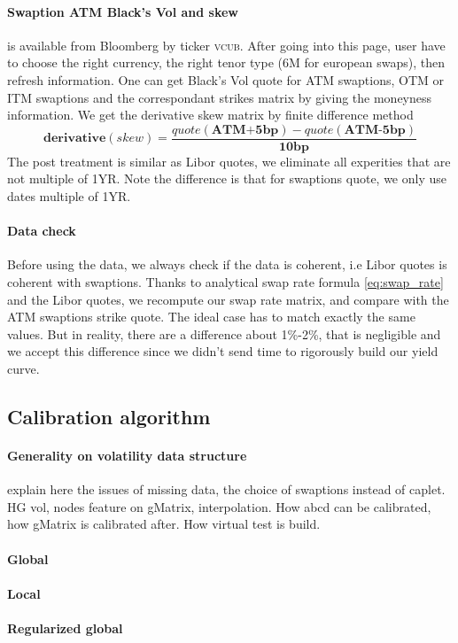 \documentclass[a4paper,10pt]{article}
\newcommand{\bl}[1]{{\scshape  #1}}
\begin{document}
\paragraph{Swaption ATM Black's Vol and skew} is available from Bloomberg by ticker \bl{vcub}. After going into this page, user have to choose the right currency, the right tenor type (6M for european swaps), then refresh information. One can get Black's Vol quote for ATM swaptions, OTM or ITM swaptions and the correspondant strikes matrix by giving the moneyness information. We get the derivative skew matrix by finite difference method
\[
\textbf{derivative}(skew) = \frac{quote (\textbf{ATM+5bp}) - quote(\textbf{ATM-5bp}) }{\textbf{10bp}}
\]
The post treatment is similar as Libor quotes, we eliminate all experities that are not multiple of 1YR. Note the difference is that for swaptions quote, we only use dates multiple of 1YR. 
\paragraph{Data check}
Before using the data, we always check if the data is coherent, i.e Libor quotes is coherent with swaptions. Thanks to analytical swap rate formula \ref{eq:swap_rate} and the Libor quotes, we recompute our swap rate matrix, and compare with the ATM swaptions strike quote. The ideal case has to match exactly the same values. But in reality, there are a difference about 1\%-2\%, that is negligible and we accept this difference since we didn't send time to rigorously build our yield curve.    
\subsection{Calibration algorithm}
\paragraph{Generality on volatility data structure}
explain here the issues of missing data, the choice of swaptions instead of caplet. HG vol, nodes feature on gMatrix, interpolation. How abcd can be calibrated, how gMatrix is calibrated after. How virtual test is build.
\paragraph{Global}
\paragraph{Local}
\paragraph{Regularized global}
\end{document}
